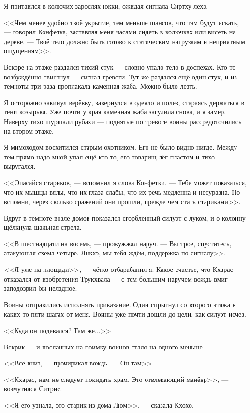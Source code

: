 Я притаился в колючих зарослях юкки, ожидая сигнала Сиртху-лехэ.

<<Чем менее удобно твоё укрытие, тем меньше шансов, что там будут искать, --- говорил Конфетка, заставляя меня часами сидеть в колючках или висеть на дереве.
--- Твоё тело должно быть готово к статическим нагрузкам и неприятным ощущениям>>.

Вскоре на этаже раздался тихий стук --- словно упало тело в доспехах.
Кто-то возбуждённо свистнул --- сигнал тревоги.
Тут же раздался ещё один стук, и из темноты три раза проплакала каменная жаба.
Можно было лезть.

Я осторожно закинул верёвку, завернулся в одеяло и полез, стараясь держаться в тени козырька.
Уже почти у края каменная жаба загулила снова, и я замер.
Наверху тихо шуршали рубахи --- поднятые по тревоге воины рассредоточились на втором этаже.

Я мимоходом восхитился старым охотником.
Его не было видно нигде.
Между тем прямо надо мной упал ещё кто-то, его товарищ лёг пластом и тихо выругался.

<<Опасайся стариков, --- вспомнил я слова Конфетки.
--- Тебе может показаться, что их мышцы вялы, что их глаза слабы, что их речь медленна и несуразна.
Но вспомни, через сколько сражений они прошли, прежде чем стать стариками>>.

Вдруг в темноте возле домов показался сгорбленный силуэт с луком, и о колонну щёлкнула шальная стрела.

<<В шестнадцати на восемь, --- прожужжал наруч.
--- Вы трое, спуститесь, атакующая схема четыре.
Ликхэ, мы тебя ждём, поддержка по сигналу>>.

<<Я уже на площади>>, --- чётко отбарабанил я.
Какое счастье, что Кхарас отказался от изобретения Трукхвала --- с тем большим наручем вождь вмиг заподозрил бы неладное.

Воины отправились исполнять приказание.
Один спрыгнул со второго этажа в каких-то пяти шагах от меня.
Воины уже почти дошли до цели, как силуэт исчез.

<<Куда он подевался?
Там же...>>

Вскрик --- и посланных на поимку воинов стало на одного меньше.

<<Все вниз, --- прочирикал вождь.
--- Он там>>.

<<Кхарас, нам не следует покидать храм.
Это отвлекающий манёвр>>, --- возмутился Ситрис.

<<Я его узнала, это старик из дома Люм>>, --- сказала Кхохо.

